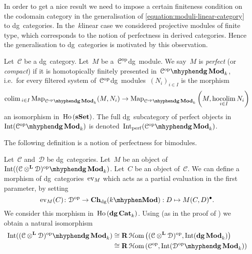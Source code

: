 \begin{refsection}
In order to get a nice result we need to impose a certain finiteness condition on the codomain category in the generalisation of \eqref{equation:moduli-linear-category} to dg~categories. In the~$k$\dash linear case we considered projective modules of finite type, which corresponds to the notion of perfectness in derived categories. Hence the generalisation to dg~categories is motivated by this observation.

\begin{definition}
  Let~$\mathcal{C}$ be a dg~category. Let~$M$ be a~$\mathcal{C}^{\mathrm{op}}$\dash dg~module. We say~$M$ is \emph{perfect} (or \emph{compact}) if it is homotopically finitely presented in~$\dgMod{\mathcal{C}^\opp}_k$, i.e.\ for every filtered system of~$\mathcal{C}^{\mathrm{op}}$\dash dg~modules~$(N_i)_{i\in I}$ is the morphism
  \begin{equation}
    \colim_{i\in I}\Map_{\dgMod{\mathcal{C}^\opp}_k}(M,N_i)\to\Map_{\dgMod{\mathcal{C}^\opp}_k}\left( M,\hocolim_{i\in I}N_i \right) 
  \end{equation}
  an isomorphism in~$\operatorname{\mathrm{Ho} \,}(\mathbf{s\,\!\mathbf{Set}})$. The full dg~subcategory of perfect objects in~$\Int(\dgMod{\mathcal{C}^\opp}_k)$ is denoted~$\Int_\perf(\dgMod{\mathcal{C}^\opp}_k)$.
\end{definition}
The following definition is a notion of perfectness for bimodules.
\begin{definition}
  Let~$\mathcal{C}$ and~$\mathcal{D}$ be dg~categories. Let~$M$ be an object of~$\Int(\dgMod{(\mathcal{C}\otimes^{\mathbf{L}}\mathcal{D})^\opp}_k)$. Let~$C$ be an object of~$\mathcal{C}$. We can define a morphism of dg~categories~$\operatorname{ev}_M$ which acts as a partial evaluation in the first parameter, by setting
  \begin{equation}
    \ev_M(C)\colon\mathcal{D}^\opp\to\Ch_\dg(k\mhyphen\Mod):D\mapsto M(C,D)^\bullet.
  \end{equation}
  We consider this morphism in~$\operatorname{\mathrm{Ho} \,}(\mathbf{dg\,Cat}_k)$. Using \cite[theorem 6.1]{toen} (as in the proof of \cite[corollary 7.6]{toen}) we obtain a natural isomorphism
  \begin{equation}
    \begin{aligned}
      \Int(\dgMod{(\mathcal{C}\otimes^{\mathbf{L}}\mathcal{D})^\opp}_k)&\cong\RRRHHom\left( (\mathcal{C}\otimes^{\mathbf{L}}\mathcal{D})^\opp,\Int(\dgMod_k) \right) \\
      &\cong\RRRHHom\left( \mathcal{C}^\opp,\Int(\dgMod{\mathcal{D}^\opp}_k) \right)
    \end{aligned}
  \end{equation}

\end{definition}
\end{refsection}
